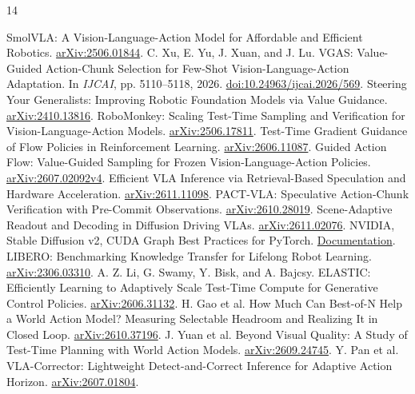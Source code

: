 \begin{thebibliography}{14}
\raggedright
{} SmolVLA: A Vision-Language-Action Model for Affordable and Efficient Robotics. \href{https://arxiv.org/abs/2506.01844}{arXiv:2506.01844}.
 C. Xu, E. Yu, J. Xuan, and J. Lu. VGAS: Value-Guided Action-Chunk Selection for Few-Shot Vision-Language-Action Adaptation. In \emph{IJCAI}, pp. 5110--5118, 2026. \href{https://doi.org/10.24963/ijcai.2026/569}{doi:10.24963/ijcai.2026/569}.
 Steering Your Generalists: Improving Robotic Foundation Models via Value Guidance. \href{https://arxiv.org/abs/2410.13816}{arXiv:2410.13816}.
 RoboMonkey: Scaling Test-Time Sampling and Verification for Vision-Language-Action Models. \href{https://arxiv.org/abs/2506.17811}{arXiv:2506.17811}.
 Test-Time Gradient Guidance of Flow Policies in Reinforcement Learning. \href{https://arxiv.org/abs/2606.11087}{arXiv:2606.11087}.
 Guided Action Flow: Value-Guided Sampling for Frozen Vision-Language-Action Policies. \href{https://arxiv.org/abs/2607.02092v4}{arXiv:2607.02092v4}.
 Efficient VLA Inference via Retrieval-Based Speculation and Hardware Acceleration. \href{https://arxiv.org/abs/2611.11098}{arXiv:2611.11098}.
 PACT-VLA: Speculative Action-Chunk Verification with Pre-Commit Observations. \href{https://arxiv.org/abs/2610.28019}{arXiv:2610.28019}.
 Scene-Adaptive Readout and Decoding in Diffusion Driving VLAs. \href{https://arxiv.org/abs/2611.02076}{arXiv:2611.02076}.
 NVIDIA, Stable Diffusion v2, CUDA Graph Best Practices for PyTorch. \href{https://docs.nvidia.com/dl-cuda-graph/latest/examples/stable-diffusion-v2.html}{Documentation}.
 LIBERO: Benchmarking Knowledge Transfer for Lifelong Robot Learning. \href{https://arxiv.org/abs/2306.03310}{arXiv:2306.03310}.
 A. Z. Li, G. Swamy, Y. Bisk, and A. Bajcsy. ELASTIC: Efficiently Learning to Adaptively Scale Test-Time Compute for Generative Control Policies. \href{https://arxiv.org/abs/2606.31132}{arXiv:2606.31132}.
 H. Gao et al. How Much Can Best-of-N Help a World Action Model? Measuring Selectable Headroom and Realizing It in Closed Loop. \href{https://arxiv.org/abs/2610.37196}{arXiv:2610.37196}.
 J. Yuan et al. Beyond Visual Quality: A Study of Test-Time Planning with World Action Models. \href{https://arxiv.org/abs/2609.24745}{arXiv:2609.24745}.
 Y. Pan et al. VLA-Corrector: Lightweight Detect-and-Correct Inference for Adaptive Action Horizon. \href{https://arxiv.org/abs/2607.01804}{arXiv:2607.01804}.
\end{thebibliography}
